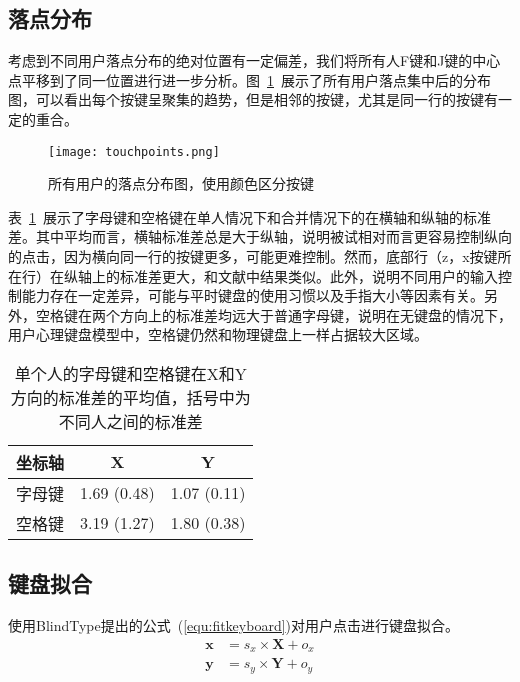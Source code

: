 \subsection{落点分布}
考虑到不同用户落点分布的绝对位置有一定偏差，我们将所有人F键和J键的中心点平移到了同一位置进行进一步分析\cite{flatglass2011findlater}\cite{palmboard2020}\cite{2018shitoast}。图~\ref{fig:points}~展示了所有用户落点集中后的分布图，可以看出每个按键呈聚集的趋势，但是相邻的按键，尤其是同一行的按键有一定的重合。

\begin{figure}[h] %
    \centering
    \texttt{[image: touchpoints.png]}
    \caption{所有用户的落点分布图，使用颜色区分按键}
    \label{fig:points}
\end{figure}

表~\ref{tab:sd}~展示了字母键和空格键在单人情况下和合并情况下的在横轴和纵轴的标准差。其中平均而言，横轴标准差总是大于纵轴，说明被试相对而言更容易控制纵向的点击，因为横向同一行的按键更多，可能更难控制。然而，底部行（z，x按键所在行）在纵轴上的标准差更大，和文献中结果类似\cite{flatglass2011findlater}。此外，说明不同用户的输入控制能力存在一定差异，可能与平时键盘的使用习惯以及手指大小等因素有关。另外，空格键在两个方向上的标准差均远大于普通字母键，说明在无键盘的情况下，用户心理键盘模型中，空格键仍然和物理键盘上一样占据较大区域。

\begin{table}[htb]
    \centering
    \begin{minipage}[t]{0.7\linewidth} %
    \caption[实验一按键标准差]{单个人的字母键和空格键在X和Y方向的标准差的平均值，括号中为不同人之间的标准差}
    \label{tab:sd}
      \centering
      \begin{tabularx}{0.6\linewidth}{c c c}
        \toprule[1.5pt]
        坐标轴 & X & Y\\\midrule[1pt]
        字母键 & 1.69 (0.48) & 1.07 (0.11)\\
        空格键 & 3.19 (1.27) & 1.80 (0.38)\\
        \bottomrule[1.5pt]
      \end{tabularx}
    \end{minipage}
  \end{table}

\subsection{键盘拟合}
使用BlindType\cite{2017blindtype}提出的公式~(\ref{equ:fitkeyboard})对用户点击进行键盘拟合。
\begin{equation}
  \label{equ:fitkeyboard}
  \begin{aligned}
  \textbf{x} &= s_{x} \times \textbf{X} + o_{x} \\
  \textbf{y} &= s_{y} \times \textbf{Y} + o_{y}
  \end{aligned}
\end{equation}

